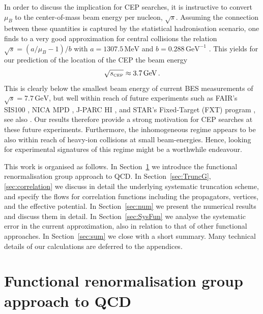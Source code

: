 \documentclass[%
reprint,
superscriptaddress,
showpacs,preprintnumbers,
 amsmath,amssymb,
 aps,
prd,
]{revtex4-1}
\def\sec#1{Section~\ref{#1}}
\begin{document}
In order to discuss the implication for CEP searches, it is
instructive to convert $\mu_B$ to the center-of-mass beam energy per
nucleon, $\sqrt{s}$. Assuming the connection between these quantities
is captured by the statistical hadronisation scenario, one finds to a
very good approximation for central collisions the relation
$\sqrt{s} = (a/\mu_B-1)/b$ with $a = 1307.5\,\text{MeV}$ and
$b = 0.288\,\text{GeV}^{-1}$ \cite{Andronic:2017pug}. This yields for
our prediction of the location of the CEP the beam energy
%
\begin{align}
  \sqrt{s_\text{\tiny CEP}} \approx 3.7\, \text{GeV}\,.
\end{align}
%
This is clearly below the smallest beam energy of current BES
measurements of $\sqrt{s} = 7.7\,\text{GeV}$, but well within reach of
future experiments such as FAIR's SIS100 \cite{Friman:2011zz}, NICA
MPD \cite{Sorin:2011zz}, J-PARC HI \cite{Sakaguchi:2017ggo}, and
STAR's Fixed-Target (FXT) program \cite{Meehan:2016qon}, see also
\cite{Dainese:2019xrz, Alemany:2019vsk, Adamova:2019vkf}. Our results
therefore provide a strong motivation for CEP searches at these future
experiments.  Furthermore, the inhomogeneous regime appears to be also
within reach of heavy-ion collisions at small beam-energies.  Hence,
looking for experimental signatures of this regime might be a
worthwhile endeavour.

This work is organised as follows. In \sec{sec:FunRG-QCD} we
introduce the functional renormalisation group approach to QCD. In
\sec{sec:TruncG}, \ref{sec:correlation} we discuss in detail the
underlying systematic truncation scheme, and specify the flows for
correlation functions including the propagators, vertices, and the
effective potential. In \sec{sec:num} we present the numerical
results and discuss them in detail. In \sec{sec:SysFun} we
analyse the systematic error in the current approximation, also in
relation to that of other functional approaches. In \sec{sec:sum}
we close with a short summary. Many technical details of our
calculations are deferred to the appendices.


  

\section{Functional renormalisation group approach to QCD}
\label{sec:FunRG-QCD}
\end{document}
